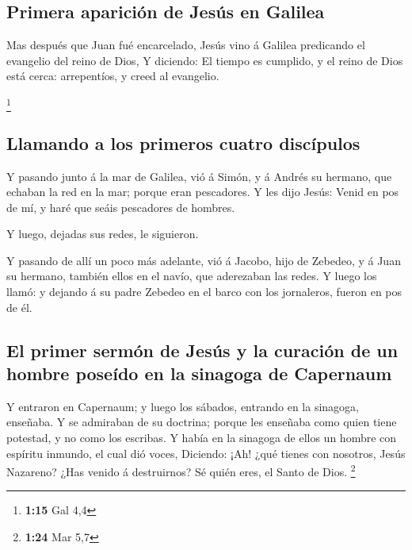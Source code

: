 \hypertarget{primera-apariciuxf3n-de-jesuxfas-en-galilea}{%
\subsection{Primera aparición de Jesús en
Galilea}\label{primera-apariciuxf3n-de-jesuxfas-en-galilea}}

 Mas después que Juan fué encarcelado, Jesús vino á Galilea
predicando el evangelio del reino de Dios,  Y diciendo: El
tiempo es cumplido, y el reino de Dios está cerca: arrepentíos, y creed
al evangelio.

\footnote{\textbf{1:15} Gal 4,4}

\hypertarget{llamando-a-los-primeros-cuatro-discuxedpulos}{%
\subsection{Llamando a los primeros cuatro
discípulos}\label{llamando-a-los-primeros-cuatro-discuxedpulos}}

 Y pasando junto á la mar de Galilea, vió á Simón, y á
Andrés su hermano, que echaban la red en la mar; porque eran pescadores.
 Y les dijo Jesús: Venid en pos de mí, y haré que seáis
pescadores de hombres.

 Y luego, dejadas sus redes, le siguieron.

 Y pasando de allí un poco más adelante, vió á Jacobo, hijo
de Zebedeo, y á Juan su hermano, también ellos en el navío, que
aderezaban las redes.  Y luego los llamó: y dejando á su
padre Zebedeo en el barco con los jornaleros, fueron en pos de él.

\hypertarget{el-primer-sermuxf3n-de-jesuxfas-y-la-curaciuxf3n-de-un-hombre-poseuxeddo-en-la-sinagoga-de-capernaum}{%
\subsection{El primer sermón de Jesús y la curación de un hombre poseído
en la sinagoga de
Capernaum}\label{el-primer-sermuxf3n-de-jesuxfas-y-la-curaciuxf3n-de-un-hombre-poseuxeddo-en-la-sinagoga-de-capernaum}}

 Y entraron en Capernaum; y luego los sábados, entrando en
la sinagoga, enseñaba.  Y se admiraban de su doctrina;
porque les enseñaba como quien tiene potestad, y no como los escribas.
 Y había en la sinagoga de ellos un hombre con espíritu
inmundo, el cual dió voces,  Diciendo: ¡Ah! ¿qué tienes con
nosotros, Jesús Nazareno? ¿Has venido á destruirnos? Sé quién eres, el
Santo de Dios. \footnote{\textbf{1:24} Mar 5,7}

